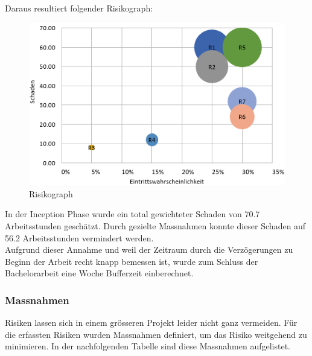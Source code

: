 \medskip \noindent
Daraus resultiert folgender Risikograph: 
\begin{figure}[H]
	\includegraphics[width=\textwidth,height=\textheight,keepaspectratio]{images/risikoanalyse.png}
	\caption{Risikograph}
\end{figure}

\noindent In der Inception Phase wurde ein total gewichteter Schaden von 70.7 Arbeitsstunden geschätzt. Durch gezielte Massnahmen konnte dieser Schaden auf 56.2 Arbeitsstunden vermindert werden. \\
Aufgrund dieser Annahme und weil der Zeitraum durch die Verzögerungen zu Beginn der Arbeit recht knapp bemessen ist, wurde zum Schluss der Bachelorarbeit eine Woche Bufferzeit einberechnet. 

\subsubsection*{Massnahmen}
Risiken lassen sich in einem grösseren Projekt leider nicht ganz vermeiden. Für die erfassten Risiken wurden Massnahmen definiert, um das Risiko weitgehend zu minimieren. In der nachfolgenden Tabelle sind diese Massnahmen aufgelistet.

